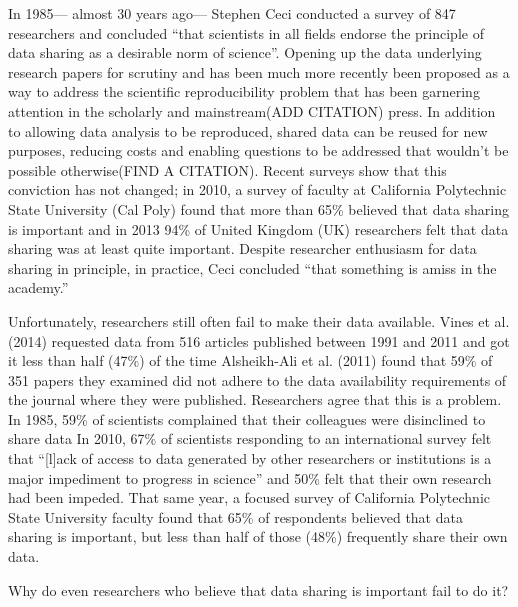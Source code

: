 \documentclass[10pt]{article}
\begin{document}
In 1985--- almost 30 years ago--- Stephen Ceci conducted a survey of 847 researchers and concluded ``that scientists in all fields endorse the principle of data sharing as a desirable norm of science''\cite{ceci_scientists_1988}.
Opening up the data underlying research papers for scrutiny and has been much more recently been proposed\cite{drew_lost_2013, collins_policy_2014} as a way to address the scientific reproducibility problem that has been garnering attention in the scholarly\cite{ioannidis_why_2005, prinz_believe_2011, mobley_survey_2013} and mainstream(ADD CITATION) press.
In addition to allowing data analysis to be reproduced, shared data can be reused for new purposes, reducing costs\cite{piwowar_data_2011} and enabling questions to be addressed that wouldn't be possible otherwise(FIND A CITATION).
Recent surveys show that this conviction has not changed; in 2010, a survey of faculty at California Polytechnic State University (Cal Poly) found that more than 65\% believed that data sharing is important\cite{scaramozzino_study_2012} and in 2013 94\% of United Kingdom (UK) researchers felt that data sharing was at least quite important\cite{bobrow_establishing_2014}.
Despite researcher enthusiasm for data sharing in principle, in practice, Ceci concluded ``that something is amiss in the academy.''

Unfortunately, researchers still often fail to make their data available.
Vines et al. (2014) requested data from 516 articles published between 1991 and 2011 and got it less than half (47\%) of the time\cite{vines_availability_2014}
Alsheikh-Ali et al. (2011) found that 59\% of 351 papers they examined did not adhere to the data availability requirements of the journal where they were published.
Researchers agree that this is a problem.
In 1985, 59\% of scientists complained that their colleagues were disinclined to share data\cite{cedi_scientists_1988}
In 2010, 67\% of scientists responding to an international survey felt that ``[l]ack of access to data generated by other researchers or institutions is a major impediment to progress in science'' and 50\% felt that their own research had been impeded\cite{tenopir_data_2011}.
That same year, a focused survey of California Polytechnic State University faculty found that 65\% of respondents believed that data sharing is important, but less than half of those (48\%) frequently share their own data\cite{scaramozzino_study_2012}.

Why do even researchers who believe that data sharing is important fail to do it?
\end{document}

